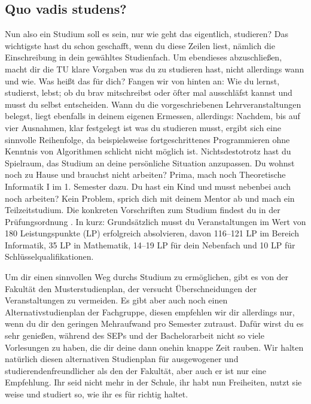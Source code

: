 \subsection{Quo vadis studens?}

Nun also ein Studium soll es sein, nur wie geht das eigentlich, studieren?
Das wichtigste hast du schon geschafft, wenn du diese Zeilen liest, nämlich die Einschreibung in dein gewähltes Studienfach.
Um ebendieses abzuschließen, macht dir die TU klare Vorgaben was du zu studieren hast, nicht allerdings wann und wie. Was heißt das für dich?
Fangen wir von hinten an:
Wie du lernst, studierst, lebst; ob du brav mitschreibst oder öfter mal ausschläfst kannst und musst du selbst entscheiden.
Wann du die vorgeschriebenen Lehrveranstaltungen belegst, liegt ebenfalls in deinem eigenen Ermessen, allerdings:
Nachdem, bis auf vier Ausnahmen, klar festgelegt ist was du studieren musst, ergibt sich eine sinnvolle Reihenfolge, da beispielsweise fortgeschrittenes Programmieren ohne Kenntnis von Algorithmen schlicht nicht möglich ist. Nichtsdestotrotz hast du Spielraum, das Studium an deine persönliche Situation anzupassen.
Du wohnst noch zu Hause und brauchst nicht arbeiten? Prima, mach noch Theoretische Informatik I im 1. Semester dazu.
Du hast ein Kind und musst nebenbei auch noch arbeiten? Kein Problem, sprich dich mit deinem Mentor ab und mach ein Teilzeitstudium.
Die konkreten Vorschriften zum Studium findest du in der Prüfungsordnung
.
In kurz: Grundsätzlich musst du Veranstaltungen im Wert von 180 Leistungspunkte (LP) erfolgreich absolvieren, davon 116–121 LP im Bereich Informatik, 35 LP in Mathematik, 14–19 LP für dein Nebenfach und 10 LP für Schlüsselqualifikationen.

Um dir einen sinnvollen Weg durchs Studium zu ermöglichen, gibt es von der Fakultät den Musterstudienplan, der versucht Überschneidungen der Veranstaltungen zu vermeiden.
Es gibt aber auch noch einen Alternativstudienplan der Fachgruppe, diesen empfehlen wir dir allerdings nur, wenn du dir den geringen Mehraufwand pro Semester zutraust. Dafür wirst du es sehr genießen, während des SEPs und der Bachelorarbeit nicht so viele Vorlesungen zu haben, die dir deine dann onehin knappe Zeit rauben.
Wir halten natürlich diesen alternativen Studienplan für ausgewogener und studierendenfreundlicher als den der Fakultät, aber auch er ist nur eine Empfehlung.
Ihr seid nicht mehr in der Schule, ihr habt nun Freiheiten, nutzt sie weise und studiert so, wie ihr es für richtig haltet.





